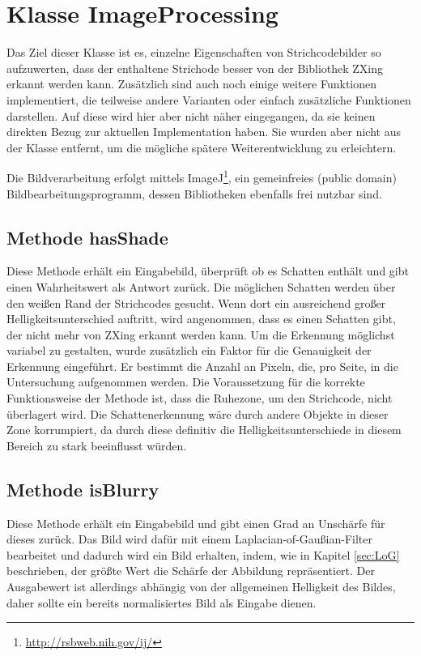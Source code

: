 \section{Klasse ImageProcessing}
\writtenby{\dcauthornameriren}%
Das Ziel dieser Klasse ist es, einzelne Eigenschaften von Strichcodebilder so aufzuwerten, dass der enthaltene Strichode besser von der Bibliothek ZXing erkannt werden kann.
Zusätzlich sind auch noch einige weitere Funktionen implementiert, die teilweise andere Varianten oder einfach zusätzliche Funktionen darstellen. Auf diese wird hier aber nicht näher eingegangen, da sie keinen direkten Bezug zur aktuellen Implementation haben. Sie wurden aber nicht aus der Klasse entfernt, um die mögliche spätere Weiterentwicklung zu erleichtern.

Die Bildverarbeitung erfolgt mittels ImageJ\footnote{\url{http://rsbweb.nih.gov/ij/}}, ein gemeinfreies (public domain) Bildbearbeitungsprogramm, dessen Bibliotheken ebenfalls frei nutzbar sind.


\subsection*{Methode hasShade}
Diese Methode erhält ein Eingabebild, überprüft ob es Schatten enthält und gibt einen Wahrheitswert als Antwort zurück.
Die möglichen Schatten werden über den weißen Rand der Strichcodes gesucht. Wenn dort ein ausreichend großer Helligkeitsunterschied auftritt, wird angenommen, dass es einen Schatten gibt, der nicht mehr von ZXing erkannt werden kann.
Um die Erkennung möglichst variabel zu gestalten, wurde zusätzlich ein Faktor für die Genauigkeit der Erkennung eingeführt. Er bestimmt die Anzahl an Pixeln, die, pro Seite, in die Untersuchung aufgenommen werden.
Die Voraussetzung für die korrekte Funktionsweise der Methode ist, dass die Ruhezone, um den Strichcode, nicht überlagert wird. Die Schattenerkennung wäre durch andere Objekte in dieser Zone korrumpiert, da durch diese definitiv die Helligkeitsunterschiede in diesem Bereich zu stark beeinflusst würden.


\subsection*{Methode isBlurry}
Diese Methode erhält ein Eingabebild und gibt einen Grad an Unschärfe für dieses zurück.
Das Bild wird dafür mit einem Laplacian-of-Gaußian-Filter bearbeitet und dadurch wird ein Bild erhalten, indem, wie in Kapitel \ref*{sec:LoG} beschrieben, der größte Wert die Schärfe der Abbildung repräsentiert.
Der Ausgabewert ist allerdings abhängig von der allgemeinen Helligkeit des Bildes, daher sollte ein bereits normalisiertes Bild als Eingabe dienen.


